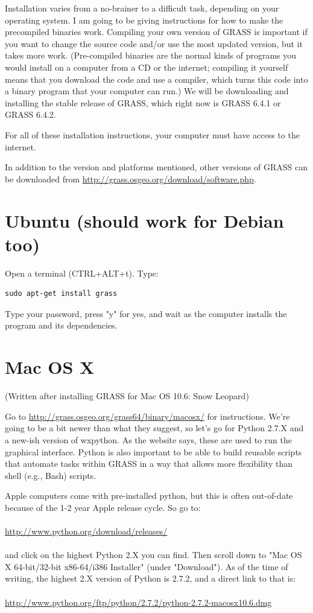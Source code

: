 \documentclass{book}
\begin{document}
Installation varies from a no-brainer to a difficult task, depending on your operating system. I am going to be giving instructions for how to make the precompiled binaries work. Compiling your own version of GRASS is important if you want to change the source code and/or use the most updated version, but it takes more work. (Pre-compiled binaries are the normal kinds of programs you would install on a computer from a CD or the internet; compiling it yourself means that you download the code and use a compiler, which turns this code into a binary program that your computer can run.) We will be downloading and installing the stable release of GRASS, which right now is GRASS 6.4.1 or GRASS 6.4.2.

For all of these installation instructions, your computer must have access to the internet.

In addition to the version and platforms mentioned, other versions of GRASS can be downloaded from \url{http://grass.osgeo.org/download/software.php}.

\section{Ubuntu (should work for Debian too)}

Open a terminal (CTRL+ALT+t). Type:
\begin{lstlisting}
sudo apt-get install grass
\end{lstlisting}
Type your password, press "y" for yes, and wait as the computer installs the program and its dependencies.

\section{Mac OS X}

(Written after installing GRASS for Mac OS 10.6: Snow Leopard)

Go to \url{http://grass.osgeo.org/grass64/binary/macosx/} for instructions. We're going to be a bit newer than what they suggest, so let's go for Python 2.7.X and a new-ish version of wxpython. As the website says, these are used to run the graphical interface. Python is also important to be able to build reusable scripts that automate tasks within GRASS in a way that allows more flexibility than shell (e.g., Bash) scripts.

Apple computers come with pre-installed python, but this is often out-of-date because of the 1-2 year Apple release cycle. So go to:
\\ \\
\noindent \url{http://www.python.org/download/releases/}
\\ \\
\noindent and click on the highest Python 2.X you can find. Then scroll down to "Mac OS X 64-bit/32-bit x86-64/i386 Installer" (under "Download"). As of the time of writing, the highest 2.X version of Python is 2.7.2, and a direct link to that is:
\\ \\
\noindent \url{http://www.python.org/ftp/python/2.7.2/python-2.7.2-macosx10.6.dmg}
\\
\end{document}
